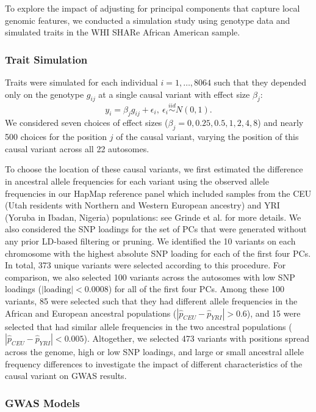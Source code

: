 \documentclass[12pt]{article}
\newcommand{\add}[1]{{\color{red}{[... #1 ...]}}}
\begin{document}
To explore the impact of adjusting for principal components that capture local genomic features, we conducted a simulation study using genotype data and simulated traits in the WHI SHARe African American sample.

\subsubsection{Trait Simulation}

Traits were simulated for each individual $i = 1, \dots, 8064$ such that they depended only on the genotype $g_{ij}$ at a single causal variant with effect size $\beta_j$: $$y_i = \beta_j g_{ij} + \epsilon_i, \ \epsilon_i \stackrel{iid}{\sim} N(0, 1).$$
We considered seven choices of effect sizes ($\beta_j = 0, 0.25, 0.5, 1, 2, 4, 8$) and nearly 500 choices for the position $j$ of the causal variant, varying the position of this causal variant across all 22 autosomes.

To choose the location of these causal variants, we first estimated the difference in ancestral allele frequencies for each variant using the observed allele frequencies in our HapMap reference panel which included samples from the CEU (Utah residents with Northern and Western European ancestry) and YRI (Yoruba in Ibadan, Nigeria)  populations: see Grinde et al. \citep{steam} for more details.
We also considered the SNP loadings %
for the set of PCs that were generated without any prior LD-based filtering or pruning.
We identified the 10 variants on each chromosome with the highest absolute SNP loading for each of the first four PCs. 
In total, 373 unique variants were selected according to 	this procedure. 
For comparison, we also selected 100 variants across the autosomes with low SNP loadings ($|\text{loading}| < 0.0008$) for all of the first four PCs.
Among these 100 variants, 85 were selected such that they had different allele frequencies in the African and European ancestral populations ($|\hat{p}_{CEU} - \hat{p}_{YRI}| > 0.6$), and 15 were selected that had similar allele frequencies in the two ancestral populations ($|\hat{p}_{CEU} - \hat{p}_{YRI}| < 0.005$).
Altogether, we selected 473 variants with positions spread across the genome, high or low SNP loadings, and large or small ancestral allele frequency differences to investigate the impact of different characteristics of the causal variant on GWAS results.


\subsubsection{GWAS Models}
\end{document}
